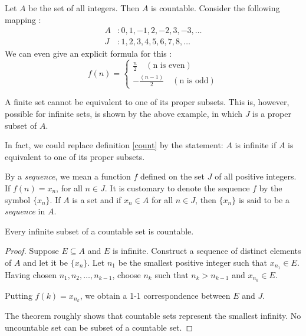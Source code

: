 \begin{exmp}
	Let $A$ be the set of all integers. Then $A$ is countable.
	Consider the following mapping :
	\begin{align*}
		A & : 0, 1, -1, 2, -2, 3, -3, \dots \\
		J & : 1, 2, 3, 4, 5, 6, 7, 8, \dots  
	\end{align*}
	We can even give an explicit formula for this :
	$$ 
	f(n) = 
	\begin{cases}
		\frac{n}{2} \quad (\text{n is even}) \\
		-\frac{(n-1)}{2} \quad (\text{n is odd})
	\end{cases}
	$$
\end{exmp}

\begin{rem}
	A finite set cannot be equivalent to one of its proper subsets. 
	This is, however, possible for infinite sets, is shown by the above example, 
	in which $J$ is a proper subset of $A$.

	In fact, we could replace definition \ref{count} by the statement: 
	$A$ is infinite if $A$ is equivalent to one of its proper subsets.
\end{rem}


\begin{defn}
	By a {\it sequence}, we mean a function $f$ defined on the set $J$ of all positive integers.
	If $f(n) = x_n$, for all $n \in J$. It is customary to denote the sequence $f$ by the symbol $\{ x_n \}$.
	If $A$ is a set and if $x_n \in A$ for all $n \in J$, then $\{x_n\}$ is said to be a {\it sequence} in $A$.
\end{defn}

\begin{thm}
	Every infinite subset of a countable set is countable.
	\begin{proof}
		Suppose $E \subseteq A$ and $E$ is infinite.
		Construct a sequence of distinct elements of $A$ and let it be $\{x_n\}$.
		Let $n_1$ be the smallest positive integer such that $x_{n_1} \in E$.
		Having chosen $n_1, n_2, \dots, n_{k-1}$, choose $n_k$ such that $n_k > n_{k-1}$
		and $x_{n_k} \in E$.

		Putting $f(k) = x_{n_k}$, we obtain a 1-1 correspondence between $E$ and $J$.

		The theorem roughly shows that countable sets represent the smallest infinity.
		No uncountable set can be subset of a countable set.
	\end{proof}
\end{thm}


